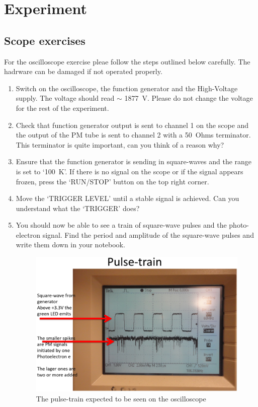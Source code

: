 \documentclass[10pt,aps,twocolumn,secnumarabic,balancelastpage,amsmath,amssymb,nofootinbib,floatfix]{revtex4}
\begin{document}
\section{Experiment}

\subsection{Scope exercises}

For the oscilloscope exercise pleae follow the steps outlined below carefully. The hadrware can be damaged if not operated properly.

\begin{enumerate}
\item Switch on the oscilloscope, the function generator and the High-Voltage supply. The voltage should read $\sim$ 1877~V. Please do not change the voltage for the rest of the experiment. 

\item Check that function generator output is sent to channel 1 on the scope and the output of the PM tube is sent to channel 2 with a 50~Ohms terminator. This terminator is quite important, can you think of a reason why?

\item Ensure that the function generator is sending in square-waves and the range is set to `100~K'. If there is no signal on the scope or if the signal appears frozen, press the `RUN/STOP' button on the top right corner. 

\item Move the `TRIGGER LEVEL' until a stable signal is achieved. Can you understand what the `TRIGGER' does?

\item You should now be able to see a train of square-wave pulses and the photo-electron signal. Find the period and amplitude of the square-wave pulses and write them down in your notebook. 

\begin{figure}
  \centering
  \includegraphics[width=1.0\linewidth]{figs/pulsetrain.png}
  \caption{The pulse-train expected to be seen on the oscilloscope}
  \label{fig:pulsetrain}
\end{figure}


\end{enumerate}
\end{document}
